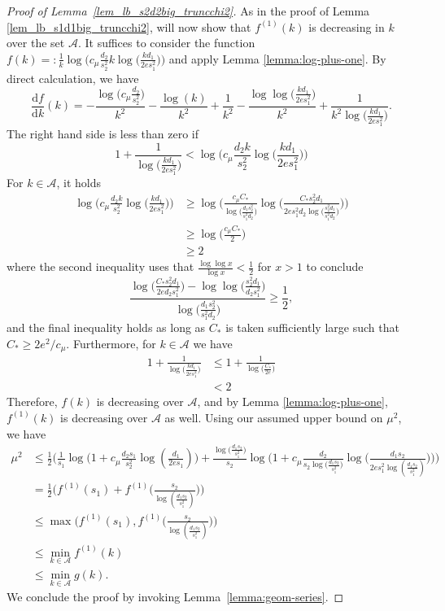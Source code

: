 \documentclass{article}
\newcommand{\D}{\textrm{d}}
\newcommand{\cA}{\mathcal{A}}
\newcommand{\Ct}{C_{*}}
\theoremstyle{remark}
\begin{document}
\begin{proof}[Proof of Lemma~\ref{lem_lb_s2d2big_truncchi2}]
    As in the proof of Lemma \ref{lem_lb_s1d1big_truncchi2}, will now show that $f^{(1)}(k)$ is decreasing in $k$ over the set $\cA$. It suffices to consider the function $f(k) =: \frac{1}{k}\log\Big(c_\mu\frac{d_2}{s^2_2}k\log\big(\frac{kd_1}{2es_1^2}\big)\Big)$ and apply Lemma \ref{lemma:log-plus-one}. By direct calculation, we have
    \[\frac{\D f}{\D k}(k) = -\frac{\log\big(c_\mu\frac{d_2}{s_2^2}\big)}{k^2} - \frac{\log(k)}{k^2} + \frac{1}{k^2} - \frac{\log \log \big(\frac{kd_1}{2es_1^2}\big)}{k^2} + \frac{1}{k^2\log\big(\frac{kd_1}{2es_1^2}\big)}.\]
    The right hand side is less than zero if 
    \[1 + \frac{1}{\log\big(\frac{kd_1}{2es_1^2}\big)} < \log\Big(c_\mu\frac{d_2k}{s_2^2}\log \big(\frac{kd_1}{2es_1^2}\big)\Big)\]
    For $k \in \cA$, it holds 
    \begin{align*}
        \log\Big(c_\mu\frac{d_2k}{s_2^2} \log \big(\frac{kd_1}{2es_1^2}\big)\Big) 
        &\geq \log\Bigg(\frac{c_\mu \Ct}{\log\big(\frac{d_1s_2^2}{s_1^2d_2}\big)} \log \Big(\frac{\Ct s_2^2d_1}{2es_1^2d_2\log\big(\frac{s_2^2d_1}{s_1^2d_2}\big)}\Big)\Bigg) \\
        &\geq \log\Big(\frac{c_\mu \Ct }{2} \Big) \\
        &\geq 2
    \end{align*}
    where the second inequality uses that $\frac{\log \log x}{\log x} < \frac12$ for $x > 1$ to conclude 
    $$\frac{\log\big(\frac{\Ct s_2^2d_1}{2ed_2s_1^2}\big) - \log \log \big(\frac{s_2^2d_1}{d_2s_1^2}\big)}{\log \big(\frac{d_1s_2^2}{s_1^2d_2}\big)} \geq \frac12,$$
    and the final inequality holds as long as $\Ct$ is taken sufficiently large such that $\Ct \geq 2e^2 / c_\mu$. Furthermore, for $k \in \cA$ we have 
    \begin{align*}
        1 + \frac{1}{\log \big(\frac{kd_1}{2es_1^2}\big)} &\leq 1 + \frac{1}{\log\big(\frac{\Ct}{2e}\big)} \\
        &< 2
    \end{align*}
    Therefore, $f(k)$ is decreasing over $\cA$, and by Lemma \ref{lemma:log-plus-one}, $f^{(1)}(k)$ is decreasing over $\cA$ as well. Using our assumed upper bound on $\mu^2$, we have 
    \begin{align*}
        \mu^2 &\leq \frac12\bigg(\frac{1}{s_1}\log\Big(1 + c_\mu \frac{d_2s_1}{s_2^2}\log(\frac{d_1}{2es_1})\Big) + \frac{\log\big(\frac{d_1s_2}{s_1^2}\big)}{s_2}\log\Big(1 + c_\mu \frac{d_2}{s_2\log\big(\frac{d_1s_2}{s_1^2}\big)}\log\big(\frac{d_1s_2}{2es_1^2\log(\frac{d_1s_2}{s_1^2})}\big)\Big)\bigg) \\
        &= \frac12\Big(f^{(1)}(s_1) + f^{(1)}\big(\frac{s_2}{\log(\frac{d_1s_2}{s_1^2})}\big)\Big) \\
        &\leq \max\Big(f^{(1)}(s_1), f^{(1)}\big(\frac{s_2}{\log(\frac{d_1s_2}{s_1^2})}\big)\Big) \\
        &\leq \min_{k \in \cA}f^{(1)}(k) \\
        &\leq \min_{k\in \cA}g(k).
    \end{align*}
    We conclude the proof by invoking Lemma~\ref{lemma:geom-series}. 
\end{proof}
\end{document}
